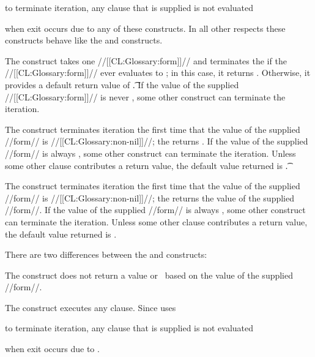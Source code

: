 to terminate iteration,
any  clause that is supplied is not evaluated

when exit occurs due to any of these constructs.
In all other respects these
constructs behave like the  and  constructs.

  The  construct takes one //[[CL:Glossary:form]]// and terminates the 
  if the //[[CL:Glossary:form]]// ever evaluates to \nil; in this case, it returns
  \nil.  Otherwise, it provides a default return value of \t.
If the value of the supplied //[[CL:Glossary:form]]// is never \nil, some other construct
can terminate the iteration.
 




The  construct terminates iteration the first time that
the value of the supplied //form// is //[[CL:Glossary:non-nil]]//; the  returns 
\nil.                                         
If the value of the supplied //form// is always  \nil, some other 
construct can terminate the iteration.  
Unless some other clause contributes 
a return value, the default value returned is \t.
 




The  construct terminates iteration the first time that the
value of the supplied //form// is //[[CL:Glossary:non-nil]]//; the  returns the
value of the supplied //form//.
If the value of the supplied //form// 
is always  \nil, some other
construct can terminate the iteration.  Unless some other clause contributes a 
return value, the default value returned is \nil.
 
 

There are two differences between the  and 
constructs: 
 
\beginlist
\itemitem{\bull} The  construct does not return a value or 
\nil\ based on the value of the supplied //form//.
 
\itemitem{\bull} The  construct executes 
any  clause.
Since  uses

to terminate iteration,
any  clause that is supplied is not evaluated

when exit occurs due to .
 
\endlist
 
